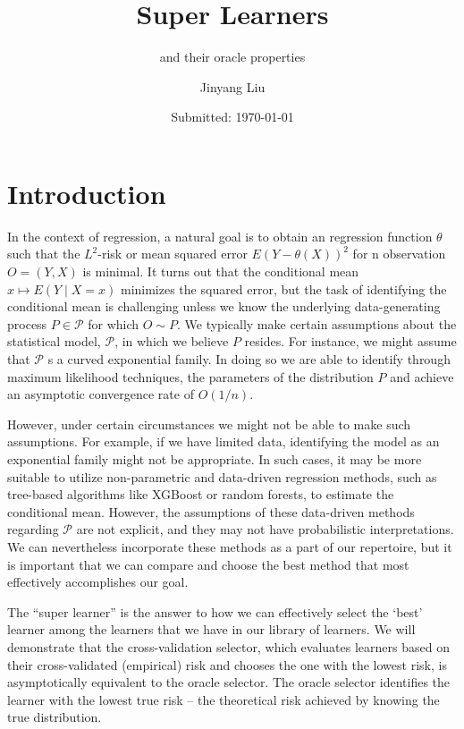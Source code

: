 \documentclass[11pt, a4paper]{article}
\author{Jinyang Liu}
\title{Super Learners}
\subtitle{and their oracle properties}
\date{Submitted: \today}
\theoremstyle{definition}
\theoremstyle{remark}
\begin{document}
\begingroup
    \selectfont
    \maketitle
    \tableofcontents
    \newpage
\endgroup


\section{Introduction}
In the context of regression, a natural goal is to obtain an regression function $ \theta $ such that the $ L^2 $-risk or mean squared error $ E(Y - \theta(X))^2 $ for  n observation $ O = (Y, X) $ is minimal. It turns out that the conditional mean $ x \mapsto E(Y \mid X = x) $ minimizes the squared error, but the task of identifying the conditional mean is challenging unless we know the underlying data-generating process $ P \in \mathcal{P} $ for which $ O \sim P $. We typically make certain assumptions about the statistical model, $\mathcal{P}$, in which we believe $P$ resides. For instance, we might assume that $\mathcal{P}$ s a curved exponential family. In doing so we are able to identify through maximum likelihood techniques, the parameters of the distribution $ P $ and achieve an asymptotic convergence rate of $ O(1/n) $. 

However, under certain circumstances we might not be able to make such assumptions.
For example, if we have limited data, identifying the model as an exponential family might not be appropriate. In such cases, it may be more suitable to utilize non-parametric and data-driven regression methods, such as tree-based algorithms like XGBoost or random forests, to estimate the conditional mean. However, the assumptions of these data-driven methods regarding $ \mathcal{P} $ are not explicit, and they may not have probabilistic interpretations. We can nevertheless incorporate these methods as a part of our repertoire, but it is important that we can compare and choose the best method that most effectively accomplishes our goal. 

The ``super learner'' is the answer to how we can effectively select the `best' learner among the learners that we have in our library of learners. We will demonstrate that the cross-validation selector, which evaluates learners based on their cross-validated (empirical) risk and chooses the one with the lowest risk, is asymptotically equivalent to the oracle selector. The oracle selector identifies the learner with the lowest true risk – the theoretical risk achieved by knowing the true distribution.
\end{document}
